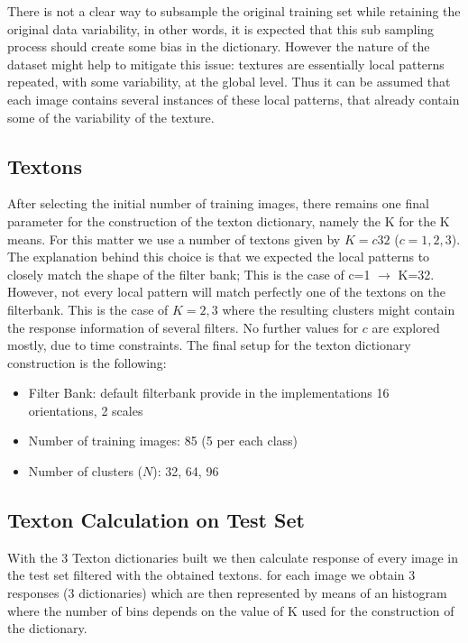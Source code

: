 \documentclass[a4paper]{article}
\begin{document}
There is not a clear way to subsample the original training set while retaining the original data variability, in other words, it is expected that this sub sampling process should create some bias in the dictionary. However the nature of the dataset might help to mitigate this issue: textures are essentially local patterns repeated, with some variability, at the global level. Thus it can be assumed that each image contains several instances of these local patterns, that already contain some of the variability of the texture.


\subsection{Textons}
After selecting the initial number of training images, there remains one final parameter for the construction of the texton dictionary, namely the K for the K means. For this matter we use a number of textons given by $K=c32$ ($c={1,2,3}$). The explanation behind this choice is that we expected the local patterns to closely match the shape of the filter bank; This is the case of c=1 $\rightarrow$ K=32. However, not every local pattern will match perfectly one of the textons on the filterbank. This is the case of $K={2,3}$ where the resulting clusters might contain the response information of several filters. No further values for $c$ are explored mostly, due to time constraints.
The final setup for the texton dictionary construction is the following:

\begin{itemize}
	\item Filter Bank: default filterbank provide in the implementations 16 orientations, 2 scales
	\item Number of training images: 85 (5 per each class)
	\item Number of clusters ($N$):  32, 64, 96
\end{itemize}

\subsection{Texton Calculation on Test Set}

With the 3 Texton dictionaries built we then calculate response of every image in the test set filtered with the obtained textons. for each image we obtain 3 responses (3 dictionaries) which are then represented by means of an histogram where the number of bins depends on the value of K used for the construction of the dictionary.
\end{document}

